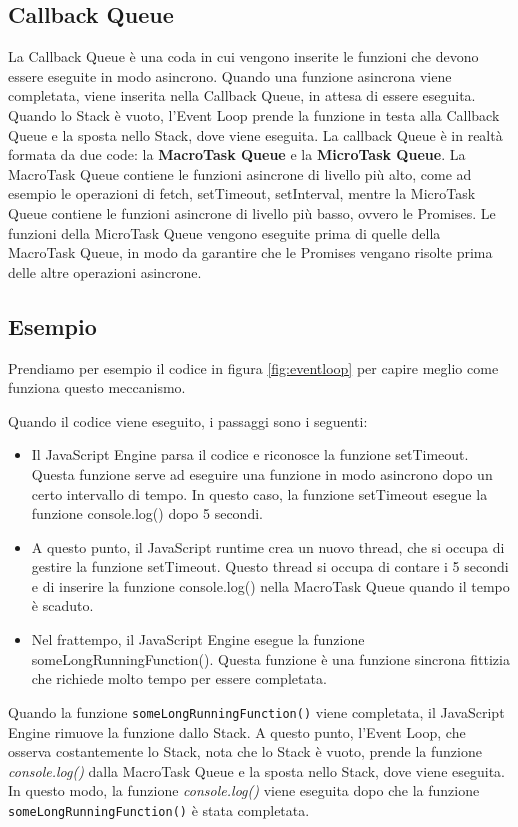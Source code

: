 \subsection{Callback Queue}
La Callback Queue è una coda in cui vengono inserite le funzioni che devono essere eseguite in modo asincrono. Quando una funzione asincrona viene completata, viene inserita nella Callback Queue, in attesa di essere eseguita. Quando lo Stack è vuoto, l'Event Loop prende la funzione in testa alla Callback Queue e la sposta nello Stack, dove viene eseguita.
La callback Queue è in realtà formata da due code: la \textbf{MacroTask Queue} e la \textbf{MicroTask Queue}. La MacroTask Queue contiene le funzioni asincrone di livello più alto, come ad esempio le operazioni di fetch, setTimeout, setInterval, mentre la MicroTask Queue contiene le funzioni asincrone di livello più basso, ovvero le Promises. Le funzioni della MicroTask Queue vengono eseguite prima di quelle della MacroTask Queue, in modo da garantire che le Promises vengano risolte prima delle altre operazioni asincrone. 

\subsection{Esempio}
Prendiamo per esempio il codice in figura \ref{fig:eventloop} per capire meglio come funziona questo meccanismo.

Quando il codice viene eseguito, i passaggi sono i seguenti:
\begin{itemize}
  \item Il JavaScript Engine parsa il codice e riconosce la funzione setTimeout. Questa funzione serve ad eseguire una funzione in modo asincrono dopo un certo intervallo di tempo. In questo caso, la funzione setTimeout esegue la funzione console.log() dopo 5 secondi.
  \item A questo punto, il JavaScript runtime crea un nuovo thread, che si occupa di gestire la funzione setTimeout. Questo thread si occupa di contare i 5 secondi e di inserire la funzione console.log() nella MacroTask Queue quando il tempo è scaduto.
  \item Nel frattempo, il JavaScript Engine esegue la funzione someLongRunningFunction(). Questa funzione è una funzione sincrona fittizia che richiede molto tempo per essere completata. 
\end{itemize}

Quando la funzione \texttt{someLongRunningFunction()} viene completata, il JavaScript Engine rimuove la funzione dallo Stack. A questo punto, l'Event Loop, che osserva costantemente lo Stack, nota che lo Stack è vuoto, prende la funzione \emph{ console.log()} dalla MacroTask Queue e la sposta nello Stack, dove viene eseguita. In questo modo, la funzione \emph{console.log()} viene eseguita dopo che la funzione \texttt{someLongRunningFunction()} è stata completata.

